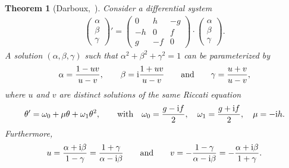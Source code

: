 \documentclass[pdftex]{sigma}%
\numberwithin{equation}{section}
\newtheorem{Theorem}{Theorem}[section]
\begin{document}
\begin{Theorem}[{Darboux,~\cite[Chapter~II, pp.~30--31]{da3}}]\label{tso3dar}
Consider a differential system
\begin{gather}\label{etso3dar}
 \begin{pmatrix} \alpha \\ \beta \\ \gamma \end{pmatrix}' = \begin{pmatrix} 0 & h & -g \\ -h & 0 & f \\ g & -f & 0 \end{pmatrix} \cdot \begin{pmatrix} \alpha \\ \beta \\ \gamma \end{pmatrix}\!.
\end{gather}
A solution $(\alpha, \beta, \gamma)$ such that $\alpha^2+\beta^2+\gamma^2=1$
can be parameterized by
\begin{gather}\label{etso3dar2}
\alpha=\dfrac{1-uv}{u-v}, \qquad
\beta={\rm i} \dfrac{1+uv}{u-v} \qquad \text{and} \qquad \gamma= \dfrac{u+v}{u-v},
\end{gather}
where $u$ and $v$ are distinct solutions of the same Riccati equation
\begin{gather*}%
\theta'= \omega_0+\mu\theta+{\omega_1}\theta^2, \qquad \textrm{with} \quad
 \omega_0= \dfrac{g-{\rm i} f}{2}, \quad \omega_1= \dfrac{g+{\rm i} f}{2},
 \quad \mu=-{\rm i} h.
\end{gather*}
Furthermore,
\begin{gather*}%
u=\dfrac{\alpha+{\rm i}\beta}{ 1-\gamma} = \dfrac{1+\gamma
}{\alpha-{\rm i}\beta} \qquad \text{and} \qquad v=-\dfrac{1-\gamma}{\alpha-{\rm i}\beta} = -\dfrac{\alpha+{\rm i}\beta}{1+\gamma}.
\end{gather*}
\end{Theorem}
\end{document}
